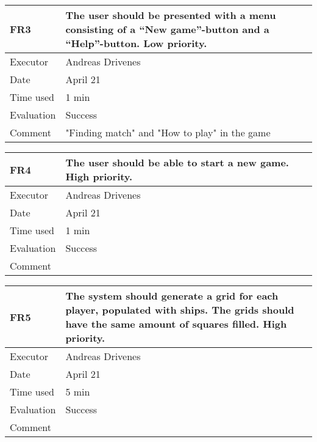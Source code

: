 \begin{table}[H]
\begin{tabular}{|l|p{10cm}|}
\hline
\textbf{FR3} & The user should be presented with a menu consisting of a “New game”-button and a “Help”-button. Low priority. \\ \hline
Executor    & Andreas Drivenes            \\ \hline
Date        & April 21            \\ \hline
Time used   & 1 min            \\ \hline
Evaluation  & Success            \\ \hline
Comment     & "Finding match" and "How to play" in the game            \\ \hline
\end{tabular}
\end{table}

\begin{table}[H]
\begin{tabular}{|l|p{10cm}|}
\hline
\textbf{FR4} & The user should be able to start a new game. High priority. \\ \hline
Executor    & Andreas Drivenes            \\ \hline
Date        & April 21            \\ \hline
Time used   & 1 min            \\ \hline
Evaluation  & Success            \\ \hline
Comment     &          \\ \hline
\end{tabular}
\end{table}

\begin{table}[H]
\begin{tabular}{|l|p{10cm}|}
\hline
\textbf{FR5} & The system should generate a grid for each player, populated with ships. The grids should have the same amount of squares filled. High priority. \\ \hline
Executor    & Andreas Drivenes            \\ \hline
Date        & April 21            \\ \hline
Time used   & 5 min            \\ \hline
Evaluation  & Success            \\ \hline
Comment     &          \\ \hline
\end{tabular}
\end{table}

